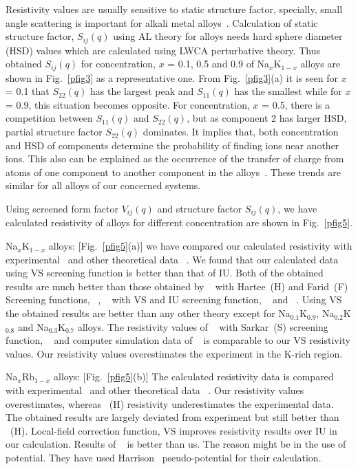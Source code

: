 \documentclass[final12pt]{elsarticle}
\begin{document}
Resistivity values are usually sensitive to static structure factor, specially, small angle scattering is important for alkali metal alloys~\cite{Faber2010}. Calculation of static structure factor, $S_{ij}(q)$ using AL theory for alloys needs hard sphere diameter (HSD) values which are calculated using LWCA perturbative theory. Thus obtained $S_{ij}(q)$ for concentration, $x$ = 0.1, 0.5 and 0.9 of Na$_x$K$_{1-x}$ alloys are shown in Fig.~\ref{pfig3} as a representative one. From Fig.~\ref{pfig3}(a) it is seen for $x$ = 0.1 that $S_{22}(q)$ has the largest peak and $S_{11}(q)$ has the smallest while for $x$ = 0.9, this situation becomes opposite. For concentration, $x$ = 0.5, there is a competition between $S_{11}(q)$ and $S_{22}(q)$, but as component 2 has larger HSD, partial structure factor $S_{22}(q)$ dominates. It implies that, both concentration and HSD of components determine the probability of finding ions near another ions. This also can be explained as the occurrence of the transfer of charge from atoms of one component to another component in the alloys~\cite{Hoshino}. These trends are similar for all alloys of our concerned systems.
  
Using screened form factor $V_{ij}(q)$ and structure factor $S_{ij}(q)$, we have calculated resistivity of alloys for different concentration are shown in Fig.~\ref{pfig5}.

Na$_{x}$K$_{1-x}$ alloys: [Fig.~\ref{pfig5}(a)] we have compared our calculated resistivity with experimental~\cite{Lugt1978} and other theoretical data ~\cite{Korkmaz2013,Vora2007,Mishra1990,Wang1980,Singh1991,Malan2018,Thakur2005}. We found that our calculated data using VS screening function is better than that of IU. Both of the obtained results are much better than those obtained by ~\cite{Vora2007} with Hartee~\cite{Harrison1999}(H) and Farid~\cite{Farid1993}(F) Screening functions, ~\cite{Mishra1990}, ~\cite{Malan2018} with VS and IU screening function, ~\cite{Singh1991} and ~\cite{Wang1980}. Using VS the obtained results are better than any other theory except for Na$_{0.1}$K$_{0.9}$, Na$_{0.2}$K$_{0.8}$ and Na$_{0.3}$K$_{0.7}$ alloys. The resistivity values of ~\cite{Vora2007} with Sarkar~\cite{Sarkar1998}(S) screening function, ~\cite{Korkmaz2013} and computer simulation data of ~\cite{Thakur2005} is comparable to our VS resistivity values. Our resistivity values overestimates the experiment in the K-rich region.

Na$_{x}$Rb$_{1-x}$ alloys: [Fig.~\ref{pfig5}(b)] The calculated resistivity data is compared with experimental~\cite{Lugt1978} and other theoretical data ~\cite{Vora2007,Mishra1990}. Our resistivity values overestimates, whereas ~\cite{Vora2007}(H) resistivity underestimates the experimental data. The obtained results are largely deviated from experiment but still better than ~\cite{Vora2007}(H). Local-field correction function, VS improves resistivity results over IU in our calculation. Results of ~\cite{Mishra1990} is better than us. The reason might be in the use of potential. They have used Harrison~\cite{Walter1966} pseudo-potential for their calculation. 
\end{document}
